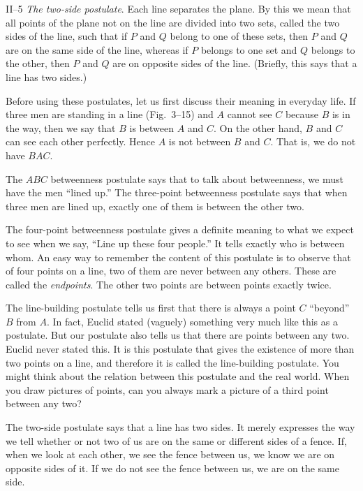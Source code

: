 \documentclass[11pt]{book}
\theoremstyle{bkplain}
\begin{document}
\medskip
\noindent II--5 \emph{The two-side postulate}. Each line separates the plane. By
this we mean that all points of the plane not on the line are divided into two
sets, called the two sides of the line, such that if $P$ and $Q$ belong to one of
these sets, then $P$ and $Q$ are on the same side of the line, whereas if $P$
belongs to one set and $Q$ belongs to the other, then $P$ and $Q$ are on opposite
sides of the line. (Briefly, this says that a line has two sides.)

\medskip
Before using these postulates, let us first discuss their meaning in everyday
life. If three men are standing in a line (Fig.~3--15) and $A$ cannot see $C$
because $B$ is in the way, then we say that $B$ is between $A$ and $C$. On the
other hand, $B$ and $C$ can see each other perfectly. Hence $A$ is not between
$B$ and $C$. That is, we do not have $BAC$.

\FIGIIIFIFTEEN

The $ABC$ betweenness postulate says that to talk about betweenness, we must have
the men ``lined up.'' The three-point betweenness postulate says that when three
men are lined up, exactly one of them is between the other two.

The four-point betweenness postulate gives a definite meaning to what we expect
to see when we say, ``Line up these four people.'' It tells exactly who is
between whom. An easy way to remember the content of this postulate is to observe
that of four points on a line, two of them are never between any others. These
are called the \emph{endpoints}. The other two points are between points exactly
twice.

The line-building postulate tells us first that there is always a point $C$
``beyond'' $B$ from $A$. In fact, Euclid stated (vaguely) something very much
like this as a postulate. But our postulate also tells us that there are points
between any two. Euclid never stated this. It is this postulate that gives the
existence of more than two points on a line, and therefore it is called the
line-building postulate. You might think about the relation between this
postulate and the real world. When you draw pictures of points, can you always
mark a picture of a third point between any two?

The two-side postulate says that a line has two sides. It merely expresses the
way we tell whether or not two of us are on the same or different sides of a
fence. If, when we look at each other, we see the fence between us, we know we
are on opposite sides of it. If we do not see the fence between us, we are on the
same side.
\end{document}
